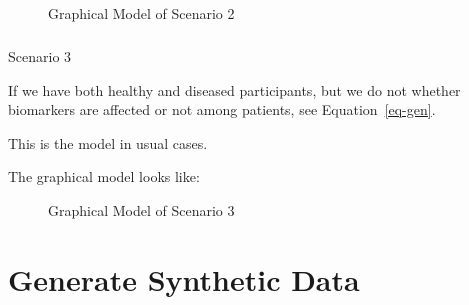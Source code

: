 \documentclass[
  letterpaper,
  DIV=11,
  numbers=noendperiod]{scrreprt}
\makeatletter
\let\oldparagraph\paragraph
\renewcommand{\paragraph}{
    \@ifstar
      \xxxParagraphStar
      \xxxParagraphNoStar
  }
\newcommand{\xxxParagraphStar}[1]{\oldparagraph*{#1}\mbox{}}
\newcommand{\xxxParagraphNoStar}[1]{\oldparagraph{#1}\mbox{}}
\makeatother
\begin{document}
\begin{figure}


\caption{\label{fig-g2}Graphical Model of Scenario 2}

\end{figure}%

\paragraph{Scenario 3}\label{scenario-3}

If we have both healthy and diseased participants, but we do not whether
biomarkers are affected or not among patients, see
Equation~\ref{eq-gen}.

This is the model in usual cases.

The graphical model looks like:

\begin{figure}


\caption{\label{fig-g3}Graphical Model of Scenario 3}

\end{figure}%


\chapter{Generate Synthetic Data}\label{generate-synthetic-data}
\end{document}
